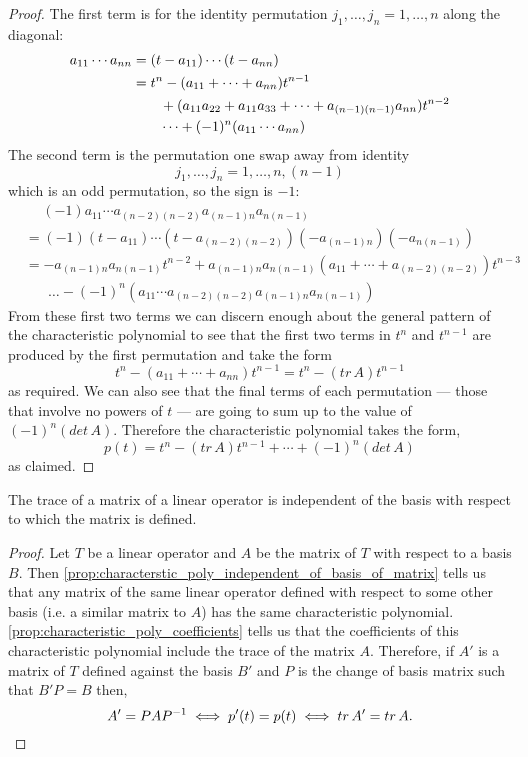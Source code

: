 \documentclass[../MathsNotesBase.tex]{subfiles}
\begin{document}
{\begin{proof}
			The first term is for the identity permutation ${ j_1,\dots,j_n = 1,\dots,n }$ along the diagonal:
			\begin{align*}
			&& a_{11} \cdots a_{nn} &= (t - a_{11})\cdots(t - a_{nn})  \\
			&& &= t^n - (a_{11} + \cdots + a_{nn})t^{n-1} \\ 
			&&&\hspace{20pt} + (a_{11}a_{22} + a_{11}a_{33} + \cdots + a_{(n-1)(n-1)}a_{nn})t^{n-2} \\
			&&&\hspace{20pt} \dots + (-1)^n(a_{11} \cdots a_{nn}) &\text{\scriptsize{}}
			\end{align*}
			The second term is the permutation one swap away from identity 
			\[ j_1,\dots,j_n = 1,\dots,n,(n-1) \]
			which is an odd permutation, so the sign is $-1$:
			\begin{align*}
			& \hspace{15pt} (-1)a_{11} \cdots a_{(n-2)(n-2)}a_{(n-1)n}a_{n(n-1)} &\\
			& =(-1)(t - a_{11}) \cdots (t - a_{(n-2)(n-2)})(-a_{(n-1)n})(-a_{n(n-1)}) & \\
			& = - a_{(n-1)n}a_{n(n-1)}t^{n-2} + a_{(n-1)n}a_{n(n-1)}(a_{11} + \cdots +  a_{(n-2)(n-2)})t^{n-3} & \\ 
			& \hspace{20pt} \dots - (-1)^n(a_{11} \cdots a_{(n-2)(n-2)}a_{(n-1)n}a_{n(n-1)}) &
			\end{align*}
			From these first two terms we can discern enough about the general pattern of the characteristic polynomial to see that the first two terms in $t^n$ and $t^{n-1}$ are produced by the first permutation and take the form
			\[ t^n - (a_{11} + \cdots + a_{nn})t^{n-1} = t^n - (tr\,A)t^{n-1} \]
			as required. We can also see that the final terms of each permutation --- those that involve no powers of $t$ --- are going to sum up to the value of ${ (-1)^n(det\,A) }$. Therefore the characteristic polynomial takes the form,
			\[ p(t) = t^n - (tr\,A)t^{n-1} + \cdots + (-1)^n(det\,A) \]
			as claimed.
		\end{proof}
	
		\bigskip
		\begin{corollary}
			\label{coro:matrix-trace-independent-of-basis}
			The trace of a matrix of a linear operator is independent of the basis with respect to which the matrix is defined.
		\end{corollary}
		\begin{proof}
			Let $T$ be a linear operator and $A$ be the matrix of $T$ with respect to a basis $B$. Then \autoref{prop:characterstic_poly_independent_of_basis_of_matrix} tells us that any matrix of the same linear operator defined with respect to some other basis (i.e. a similar matrix to $A$) has the same characteristic polynomial. \autoref{prop:characteristic_poly_coefficients} tells us that the coefficients of this characteristic polynomial include the trace of the matrix $A$. Therefore, if $A'$ is a matrix of $T$ defined against the basis $B'$ and $P$ is the change of basis matrix such that ${ B'P = B }$ then,
			\[ A' = PA{P}^{-1} \iff p'(t) = p(t) \iff tr\,A' = tr\,A.  \qedhere \]
		\end{proof}
	
}
\end{document}
